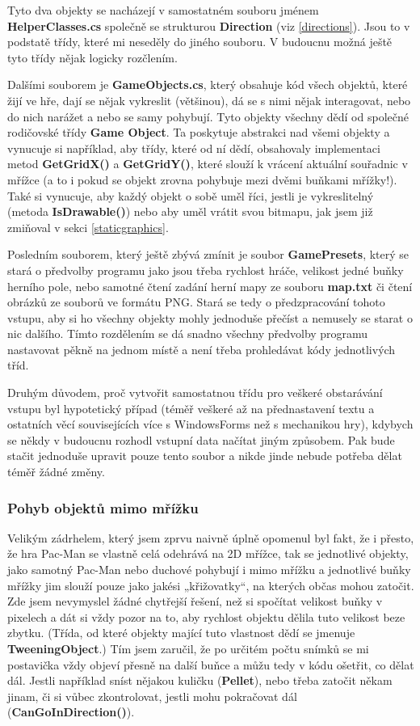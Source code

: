 \documentclass[a4]{article}
\begin{document}
Tyto dva objekty se nacházejí v samostatném souboru jménem \textbf{HelperClasses.cs} společně se strukturou \textbf{Direction} (viz \ref{directions}). Jsou to v podstatě třídy, které mi neseděly do jiného souboru. V budoucnu možná ještě tyto třídy nějak logicky rozčlením. 

Dalšími souborem je \textbf{GameObjects.cs}, který obsahuje kód všech objektů, které žijí ve hře, dají se nějak vykreslit (většinou), dá se s nimi nějak interagovat, nebo do nich narážet a nebo se samy pohybují. Tyto objekty všechny dědí od společné rodičovské třídy \textbf{Game Object}. Ta poskytuje abstrakci nad všemi objekty a vynucuje si například, aby třídy, které od ní dědí, obsahovaly implementaci metod \textbf{GetGridX()} a \textbf{GetGridY()}, které slouží k vrácení aktuální souřadnic v mřížce (a to i pokud se objekt zrovna pohybuje mezi dvěmi buňkami mřížky!). Také si vynucuje, aby každý objekt o sobě uměl říci, jestli je vykreslitelný (metoda \textbf{IsDrawable()}) nebo aby uměl vrátit svou bitmapu, jak jsem již zmiňoval v sekci \ref{staticgraphics}.

Posledním souborem, který ještě zbývá zmínit je soubor \textbf{GamePresets}, který se stará o předvolby programu jako jsou třeba rychlost hráče, velikost jedné buňky herního pole, nebo samotné čtení zadání herní mapy ze souboru \textbf{map.txt} či čtení obrázků ze souborů ve formátu PNG. Stará se tedy o předzpracování tohoto vstupu, aby si ho všechny objekty mohly jednoduše přečíst a nemusely se starat o nic dalšího. Tímto rozdělením se dá snadno všechny předvolby programu nastavovat pěkně na jednom místě a není třeba prohledávat kódy jednotlivých tříd.

Druhým důvodem, proč vytvořit samostatnou třídu pro veškeré obstarávání vstupu byl hypotetický případ (téměř veškeré až na přednastavení textu a ostatních věcí souvisejících více s WindowsForms než s mechanikou hry), kdybych se někdy v budoucnu rozhodl vstupní data načítat jiným způsobem. Pak bude stačit jednoduše upravit pouze tento soubor a nikde jinde nebude potřeba dělat téměř žádné změny.

\subsubsection{Pohyb objektů mimo mřížku} \label{tweening}
Velikým zádrhelem, který jsem zprvu naivně úplně opomenul byl fakt, že i přesto, že hra Pac-Man se vlastně celá odehrává na 2D mřížce, tak se jednotlivé objekty, jako samotný Pac-Man nebo duchové pohybují i mimo mřížku a jednotlivé buňky mřížky jim slouží pouze jako jakési „křižovatky“, na kterých občas mohou zatočit. Zde jsem nevymyslel žádné chytřejší řešení, než si spočítat velikost buňky v pixelech a dát si vždy pozor na to, aby rychlost objektu dělila tuto velikost beze zbytku. (Třída, od které objekty mající tuto vlastnost dědí se jmenuje \textbf{TweeningObject}.) Tím jsem zaručil, že po určitém počtu snímků se mi postavička vždy objeví přesně na další buňce a můžu tedy v kódu ošetřit, co dělat dál. Jestli například sníst nějakou kuličku (\textbf{Pellet}), nebo třeba zatočit někam jinam, či si vůbec zkontrolovat, jestli mohu pokračovat dál (\textbf{CanGoInDirection()}).
\end{document}
